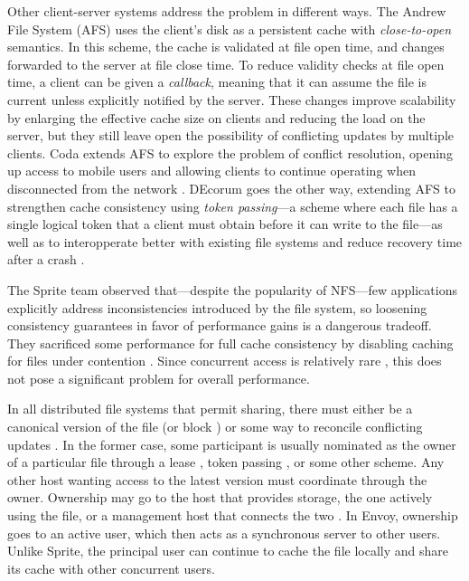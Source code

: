 Other client-server systems address the problem in different ways. The Andrew File System (AFS) \cite{satyanarayanan85,howard} uses the client's disk as a persistent cache with \emph{close-to-open} semantics. In this scheme, the cache is validated at file open time, and changes forwarded to the server at file close time. To reduce validity checks at file open time, a client can be given a \emph{callback}, meaning that it can assume the file is current unless explicitly notified by the server. These changes improve scalability by enlarging the effective cache size on clients and reducing the load on the server, but they still leave open the possibility of conflicting updates by multiple clients. Coda extends AFS to explore the problem of conflict resolution, opening up access to mobile users and allowing clients to continue operating when disconnected from the network \cite{satyanarayanan90,mummert}. DEcorum goes the other way, extending AFS to strengthen cache consistency using \emph{token passing}---a scheme where each file has a single logical token that a client must obtain before it can write to the file---as well as to interopperate better with existing file systems and reduce recovery time after a crash \cite{kazar}.

The Sprite team observed that---despite the popularity of NFS---few applications explicitly address inconsistencies introduced by the file system, so loosening consistency guarantees in favor of performance gains is a dangerous tradeoff. They sacrificed some performance for full cache consistency by disabling caching for files under contention \cite{baker91,nelson,welch}. Since concurrent access is relatively rare \cite{kistler}, this does not pose a significant problem for overall performance.

In all distributed file systems that permit sharing, there must either be a canonical version of the file (or block \cite{mcgregor}) or some way to reconcile conflicting updates \cite{kistler}. In the former case, some participant is usually nominated as the owner of a particular file through a lease \cite{gray89}, token passing \cite{burrows,mann,kazar}, or some other scheme. Any other host wanting access to the latest version must coordinate through the owner. Ownership may go to the host that provides storage, the one actively using the file, or a management host that connects the two \cite{blaze,keleher}. In Envoy, ownership goes to an active user, which then acts as a synchronous server to other users. Unlike Sprite, the principal user can continue to cache the file locally and share its cache with other concurrent users.

